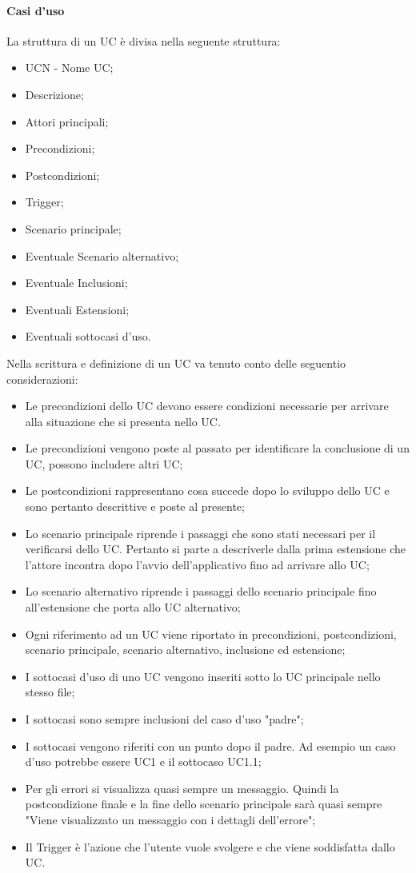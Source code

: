 \paragraph{Casi d'uso}
La struttura di un UC è divisa nella seguente struttura:
\begin{itemize}
  \item UCN - Nome UC;
  \item Descrizione;
  \item Attori principali;
  \item Precondizioni;
  \item Postcondizioni;
  \item Trigger;
  \item Scenario principale;
  \item Eventuale Scenario alternativo;
  \item Eventuale Inclusioni;
  \item Eventuali Estensioni;
  \item Eventuali sottocasi d'uso.
\end{itemize}
Nella scrittura e definizione di un UC va tenuto conto delle seguentio considerazioni:
\begin{itemize}
  \item Le precondizioni dello UC devono essere condizioni necessarie per arrivare alla situazione che si presenta nello UC.
  \item Le precondizioni vengono poste al passato per identificare la conclusione di un UC, possono includere altri UC;
  \item Le postcondizioni rappresentano cosa succede dopo lo sviluppo dello UC e sono pertanto descrittive e poste al presente;
  \item Lo scenario principale riprende i passaggi che sono stati necessari per il verificarsi dello UC. Pertanto si parte a descriverle dalla prima estensione che l'attore incontra dopo l'avvio dell'applicativo fino ad arrivare allo UC;
  \item Lo scenario alternativo riprende i passaggi dello scenario principale fino all'estensione che porta allo UC alternativo;
  \item Ogni riferimento ad un UC viene riportato in precondizioni, postcondizioni, scenario principale, scenario alternativo, inclusione ed estensione;
  \item I sottocasi d'uso di uno UC vengono inseriti sotto lo UC principale nello stesso file;
  \item I sottocasi sono sempre inclusioni del caso d'uso "padre";
  \item I sottocasi vengono riferiti con un punto dopo il padre. Ad esempio un caso d'uso potrebbe essere UC1 e il sottocaso UC1.1;
  \item Per gli errori si visualizza quasi sempre un messaggio. Quindi la postcondizione finale e la fine dello scenario principale sarà quasi sempre "Viene visualizzato un messaggio con i dettagli dell'errore";
  \item Il Trigger è l'azione che l'utente vuole svolgere e che viene soddisfatta dallo UC.
\end{itemize}

